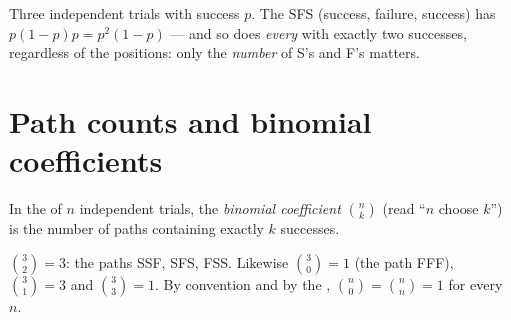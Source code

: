 \begin{example}\label{ex:g11:binom:threetrials}
Three independent trials with success  $p$. The  SFS
(success, failure, success) has  $p(1-p)p = p^2(1-p)$ --- and
so does \emph{every}  with exactly two successes, regardless of
the positions: only the \emph{number} of S's and F's matters.
\end{example}

\section{Path counts and binomial coefficients}

\begin{definition}\label{def:g11:binom:coefficient}
In the  of $n$ independent trials, the \emph{binomial
coefficient} $\binom{n}{k}$ (read ``$n$
choose $k$'') is the number of paths containing exactly $k$ successes.
\end{definition}

\begin{example}
$\binom{3}{2} = 3$: the paths SSF, SFS, FSS. Likewise $\binom{3}{0} = 1$
(the path FFF), $\binom{3}{1} = 3$ and $\binom{3}{3} = 1$. By
convention and by the , $\binom n0 = \binom nn = 1$ for every $n$.
\end{example}


